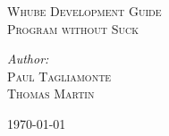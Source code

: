 \begin{titlepage}

\begin{center}

\textsc{\LARGE Whube Development Guide}\\[1.5cm]

\textsc{\Large Program without Suck}\\[0.5cm]


\begin{minipage}{0.4\textwidth}
\begin{flushleft} \large
\emph{Author:}\\
\textsc{Paul Tagliamonte} \\
\textsc{Thomas Martin}
\end{flushleft}
\end{minipage}
\begin{minipage}{0.4\textwidth}
\begin{flushright} \large
\end{flushright}
\end{minipage}

\vfill

{\large \today}

\end{center}

\end{titlepage}
